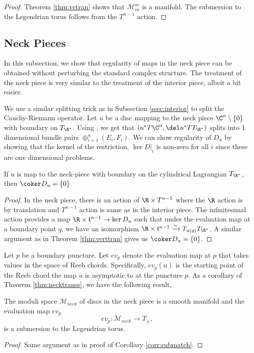 \begin{proof}
Theorem \ref{thm:vctran} shows that $\mathcal{M}^{vc}_{in}$ is a manifold. The submersion to the Legendrian torus follows from the $T^{n-1}$ action. 
\end{proof}


\subsection{Neck Pieces}


In this subsection, we show that regularity of maps in the neck piece can be obtained without perturbing the standard complex structure. The treatment of the neck piece is very similar to the treatment of the interior piece, albeit a bit easier.

We use a similar splitting trick as in Subsection \ref{ssec:interior} to split the Cauchy-Riemann operator. Let $u$ be a disc mapping to the neck piece $\C^n\setminus\{0\}$ with boundary on $T_{\R^*}$. Using \cite{riemHilb}, we get that $(u^*T\C^n,\del u^* TT_{\R^*})$ splits into 1 dimensional bundle pairs $\oplus_{i=1}^n(E_i,F_i)$. We can show regularity of $D_u$ by showing that the kernel of the restriction, $\ker D|_i$ is non-zero for all $i$ since these are one dimensional problems.  
\begin{Theorem}\label{thm:necktranss}
If $u$ is map to the neck-piece with boundary on the cylindrical Lagrangian $T_{\R^*}$, then $\coker D_u = \{0\}$
\end{Theorem}
\begin{proof}
 In the neck piece, there is an action of $\R \times T^{n-1}$ where the $\R$ action is by translation and $T^{n-1}$ action is same as in the interior piece. The infinitesimal action provides a map $\R \times \mathfrak{t}^{n-1} \to \ker D_u$ such that under the evaluation map at a boundary point $q$, we have an isomorphism $\R \times \mathfrak{t}^{n-1} \xrightarrow{\sim} T_{u(q)}T_{\R^*} $. A similar argument as in Theorem \ref{thm:verttran} gives us $\coker D_u=\{0\}$.
\end{proof}

\noindent Let $p$ be a boundary puncture. Let $ev_p$ denote the evaluation map at $p$ that takes values in the space of Reeb chords. Specifically,  $ev_p(u)$ is the starting point of the Reeb chord the map $u$ is asymptotic to at the puncture $p$. As a corollary of Theorem \ref{thm:necktranss}, we have the following result,
\begin{cor}\label{corr:neckmatch}
The moduli space $\mathcal{M}_{neck}$ of discs in the neck piece is a smooth manifold and the evaluation map $ev_p$ \begin{equation*}
ev_p : \mathcal{M}_{neck} \to T_\pm,    
\end{equation*} is a submersion to the Legendrian torus.
\end{cor}
\begin{proof}
Same argument as in proof of Corollary \ref{corr:submatch}.
\end{proof}

